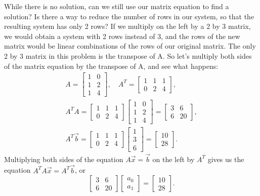 \begin{example}
While there is no solution, can we still use our matrix equation to find a solution? 
Is there a way to reduce the number of rows in our system, so that the resulting system has only 2 rows? 
If we multiply on the left by a 2 by 3 matrix, we would obtain a system with 2 rows instead of 3, and the rows of the new matrix would be linear combinations of the rows of our original matrix.  
The only 2 by 3 matrix in this problem is the transpose of A.  
So let's multiply both sides of the matrix equation by the transpose of A, and see what happens:
\begin{gather*}
A = \begin{bmatrix}1&0\\1&2\\1&4\end{bmatrix}, \quad
A^T = \begin{bmatrix}1&1&1\\0&2&4\end{bmatrix},\\
A^T A =\begin{bmatrix}1&1&1\\0&2&4\end{bmatrix}\begin{bmatrix}1&0\\1&2\\1&4\end{bmatrix}= \begin{bmatrix}3&6\\6&20\end{bmatrix},\\%
A^T\vec b =  \begin{bmatrix}1&1&1\\0&2&4\end{bmatrix}\begin{bmatrix}1\\3\\6\end{bmatrix} = \begin{bmatrix}10\\28\end{bmatrix}.
\end{gather*}
%
Multiplying both sides of the equation $A\vec x = \vec b$ on the left by $A^T$ gives us the equation 
$A^T A \vec x = A^T\vec b$, or 
$$\begin{bmatrix}3&6\\6&20\end{bmatrix} \begin{bmatrix}a_0\\a_1\end{bmatrix}=\begin{bmatrix}10\\28\end{bmatrix}.$$ 

\end{example}
